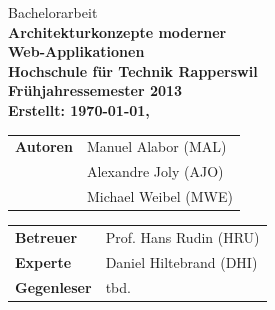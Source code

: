 \begin{titlepage}

	\thispagestyle{empty}
	\BgThispage

	\sffamily\color{titlepagefontcolor}
	\begin{center}
		\Large
		Bachelorarbeit\\[5mm]
	   
		\Huge\bfseries
		Architekturkonzepte moderner\\
		Web-Applikationen\\[15mm]

		\large\normalfont\sffamily
		Hochschule für Technik Rapperswil\\[1mm]
		Frühjahressemester 2013\\[15mm]

		\vfill
		\normalsize\normalfont\sffamily
		Erstellt: \today, \currenttime\\[10mm]
	\end{center}
	

	\begin{multicols}{2}
		\begin{tabularx}{\textwidth}{l X}
			\bfseries Autoren & Manuel Alabor (MAL)\tabularnewline
			& Alexandre Joly (AJO)\tabularnewline
			& Michael Weibel (MWE)\tabularnewline
		\end{tabularx}

		\begin{tabularx}{\textwidth}{l X}
			\bfseries Betreuer & Prof. Hans Rudin (HRU)\tabularnewline
			\bfseries Experte & Daniel Hiltebrand (DHI)\tabularnewline
			\bfseries Gegenleser & tbd.\tabularnewline
		\end{tabularx}
	\end{multicols}

\end{titlepage}

\restoregeometry